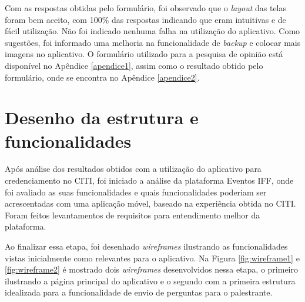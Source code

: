 Com as respostas obtidas pelo formulário, foi observado que o \textit{layout} das telas foram bem aceito, com 100\% das respostas indicando que eram intuitivas e de fácil utilização. Não foi indicado nenhuma falha na utilização do aplicativo. Como sugestões, foi informado uma melhoria na funcionalidade de \textit{backup} e colocar mais imagens no aplicativo. O formulário utilizado para a pesquisa de opinião está disponível no Apêndice \ref{apendice1}, assim como o resultado obtido pelo formulário, onde se encontra no Apêndice \ref{apendice2}.

\section{Desenho da estrutura e funcionalidades}

Após análise dos resultados obtidos com a utilização do aplicativo para credenciamento no CITI, foi iniciado a análise da plataforma Eventos IFF, onde foi avaliado as suas funcionalidades e quais funcionalidades poderiam ser acrescentadas com uma aplicação móvel, baseado na experiência obtida no CITI. Foram feitos levantamentos de requisitos para entendimento melhor da plataforma. 

Ao finalizar essa etapa, foi desenhado \textit{wireframes} ilustrando as funcionalidades vistas inicialmente como relevantes para o aplicativo. Na Figura \ref{fig:wireframe1} e \ref{fig:wireframe2} é mostrado dois \textit{wireframes} desenvolvidos nessa etapa, o primeiro ilustrando a página principal do aplicativo e o segundo com a primeira estrutura idealizada para a funcionalidade de envio de perguntas para o palestrante.


